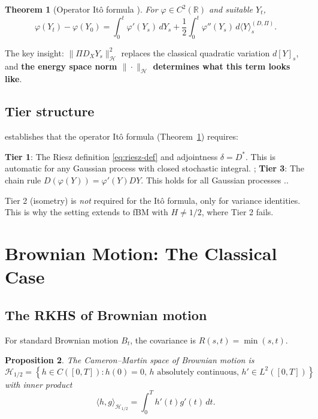 \documentclass[11pt]{article}
\newtheorem{theorem}{Theorem}[section]
\newtheorem{proposition}[theorem]{Proposition}
\theoremstyle{definition}
\newcommand{\R}{\mathbb{R}}
\newcommand{\Hi}{\mathcal{H}}
\newcommand{\ip}[2]{\langle #1, #2 \rangle}
\begin{document}
\begin{theorem}[Operator Itô formula \cite{PaperIII}]\label{thm:ito}
For $\varphi \in C^2(\R)$ and suitable $Y_t$,
\begin{equation}
\varphi(Y_t) - \varphi(Y_0) = \int_0^t \varphi'(Y_s)\,dY_s + \frac{1}{2}\int_0^t \varphi''(Y_s)\,d\langle Y \rangle^{(D,\Pi)}_s.
\end{equation}
\end{theorem}

The key insight: $\|\Pi D_X Y_s\|^2_\Hi$ replaces the classical quadratic variation $d[Y]_s$, and \textbf{the energy space norm $\|\cdot\|_\Hi$ determines what this term looks like}.

\subsection{Tier structure}

\cite{PaperIV} establishes that the operator Itô formula (Theorem~\ref{thm:ito}) requires:

\textbf{Tier 1}: The Riesz definition \eqref{eq:riesz-def} and adjointness $\delta = D^*$. This is automatic for any Gaussian process with closed stochastic integral. ; \textbf{Tier 3}: The chain rule $D(\varphi(Y)) = \varphi'(Y) DY$. This holds for all Gaussian processes \cite[Theorem 5.1]{PaperIV}..

Tier 2 (isometry) is \emph{not} required for the Itô formula, only for variance identities. This is why the setting extends to fBM with $H \neq 1/2$, where Tier 2 fails.

\section{Brownian Motion: The Classical Case}\label{sec:brownian}

\subsection{The RKHS of Brownian motion}

For standard Brownian motion $B_t$, the covariance is $R(s,t) = \min(s,t)$.

\begin{proposition}\label{prop:bm-rkhs}
The Cameron--Martin space of Brownian motion is
\begin{equation}
\Hi_{1/2} = \left\{h \in C([0,T]) : h(0) = 0,\, h \text{ absolutely continuous},\, h' \in L^2([0,T])\right\}
\end{equation}
with inner product
\begin{equation}
\ip{h}{g}_{\Hi_{1/2}} = \int_0^T h'(t) g'(t)\,dt.
\end{equation}
\end{proposition}
\end{document}
